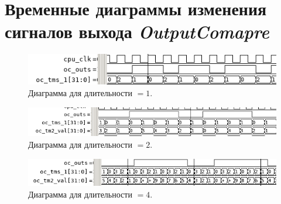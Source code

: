 \documentclass[12pt, a4paper] {ncc}
\begin{document}
\section{Временные диаграммы изменения сигналов выхода {\it OutputComapre}}

\begin{figure}[h!]
    \includegraphics[scale=0.8]{./d1.png}
	\caption{Диаграмма для длительности $ = 1$.}
\end{figure}

\begin{figure}[h!]
    \includegraphics[scale=0.8]{./d2.png}
	\caption{Диаграмма для длительности $ = 2$.}
\end{figure}

\begin{figure}[h!]
    \includegraphics[scale=0.8]{./d4.png}
	\caption{Диаграмма для длительности $ = 4$.}
\end{figure}
\end{document}
